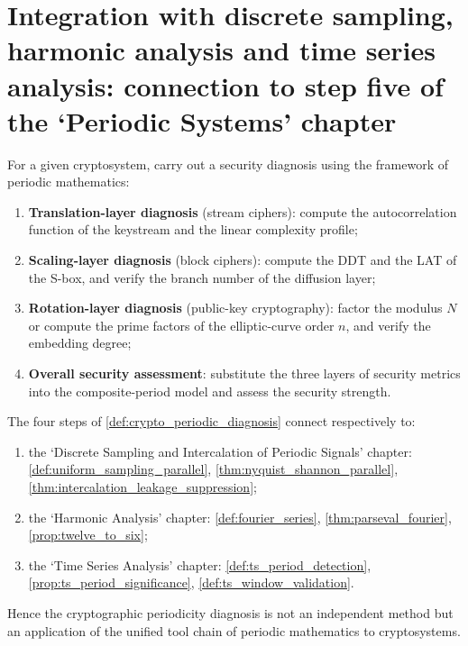 \section{Integration with discrete sampling, harmonic analysis and time series analysis: connection to step five of the `Periodic Systems' chapter}
\label{sec:crypto_integration}

\begin{definition}\label{def:crypto_periodic_diagnosis}
For a given cryptosystem, carry out a security diagnosis using the framework of periodic mathematics:
\begin{enumerate}[label=(\roman*)]
    \item \textbf{Translation-layer diagnosis} (stream ciphers): compute the autocorrelation function of the keystream and the linear complexity profile;
    \item \textbf{Scaling-layer diagnosis} (block ciphers): compute the DDT and the LAT of the S-box, and verify the branch number of the diffusion layer;
    \item \textbf{Rotation-layer diagnosis} (public-key cryptography): factor the modulus \(N\) or compute the prime factors of the elliptic-curve order \(n\), and verify the embedding degree;
    \item \textbf{Overall security assessment}: substitute the three layers of security metrics into the composite-period model and assess the security strength.
\end{enumerate}
\end{definition}

\begin{theorem}\label{thm:crypto_diagnosis_integration}
The four steps of \cref{def:crypto_periodic_diagnosis} connect respectively to:
\begin{enumerate}[label=(\roman*)]
    \item the `Discrete Sampling and Intercalation of Periodic Signals' chapter: \cref{def:uniform_sampling_parallel}, \cref{thm:nyquist_shannon_parallel}, \cref{thm:intercalation_leakage_suppression};
    \item the `Harmonic Analysis' chapter: \cref{def:fourier_series}, \cref{thm:parseval_fourier}, \cref{prop:twelve_to_six};
    \item the `Time Series Analysis' chapter: \cref{def:ts_period_detection}, \cref{prop:ts_period_significance}, \cref{def:ts_window_validation}.
\end{enumerate}
Hence the cryptographic periodicity diagnosis is not an independent method but an application of the unified tool chain of periodic mathematics to cryptosystems.
\end{theorem}

